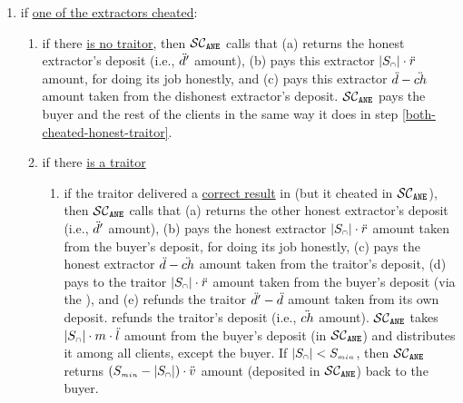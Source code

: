 \begin{itemize}
\begin{enumerate}
\begin{enumerate}
\begin{enumerate}
%
\end{enumerate}
\end{enumerate}
%
\item if \underline{one of the extractors cheated}: 
%
\begin{enumerate}
%
\item if there \underline{is no traitor}, then $\mathcal{SC}_{\mathtt{ANE}}$ calls \SCpc that (a) returns the honest extractor's deposit (i.e., $\ddot{d}'$ amount), (b) pays this extractor $|S_{\scriptscriptstyle\cap}|\cdot \ddot{r}$ amount, for doing its job honestly, and (c) pays this extractor $ \ddot{d}-\ddot{ch}$ amount taken from the dishonest extractor's deposit. 
%
%
%
 $\mathcal{SC}_{\mathtt{ANE}}$ pays the buyer and the rest of the clients in the same way it does in step \ref{both-cheated-honest-traitor}. 


%
\item if there \underline{is a traitor}
%


\begin{enumerate}
%
\item\label{one-cheated-exists-traitor-honest-traitor}  if the traitor delivered a \underline{correct result} in \SCtc (but it cheated in $\mathcal{SC}_{\mathtt{ANE}}$), then $\mathcal{SC}_{\mathtt{ANE}}$ calls \SCpc that (a) returns the other honest extractor's deposit (i.e., $\ddot{d}'$ amount), (b) pays the honest extractor $|S_{\scriptscriptstyle\cap}|\cdot \ddot{r}$ amount taken from the buyer's deposit, for doing its job honestly,  (c) pays the honest extractor $\ddot{d}- \ddot{ch}$ amount taken from the traitor's deposit,  
%
%
 (d)
 pays to the traitor $|S_{\scriptscriptstyle\cap}|\cdot \ddot{r}$ amount taken from the buyer’s deposit (via the \SCtc), and (e) refunds the traitor $\ddot{d}'-\ddot{d}$ amount taken from its own deposit.  \SCtc refunds the traitor's deposit (i.e., $\ddot{ch}$ amount).  $\mathcal{SC}_{\mathtt{ANE}}$ takes $|S_{\scriptscriptstyle\cap}|\cdot m\cdot \ddot{l}$ amount from the buyer's deposit (in $\mathcal{SC}_{\mathtt{ANE}}$) and distributes it among all clients, except the buyer. If $|{ { {S}}}_{\scriptscriptstyle\cap}|<S_{\scriptscriptstyle min}$,  then  $\mathcal{SC}_{\mathtt{ANE}}$ returns $(S_{\scriptscriptstyle min}-|{ { {S}}}_{\scriptscriptstyle\cap}|)\cdot \ddot{v}$ amount (deposited in $\mathcal{SC}_{\mathtt{ANE}}$) back  to the buyer. 
 

\end{enumerate}
\end{enumerate}
\end{enumerate}
\end{itemize}
